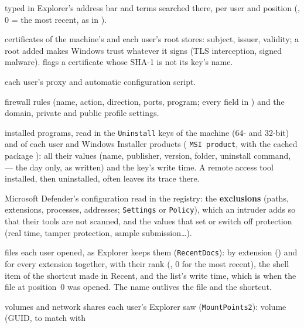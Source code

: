 \documentclass[11pt,a4paper,oneside]{report}
\begin{document}
\begin{description}[style=nextline,leftmargin=1.2em]
        typed in Explorer's address bar and terms searched there, per user and
        position (, 0 = the most recent, as in
        ).
  \item[\fichier{root\_certificates.json}] certificates of the machine's and each
        user's root stores: subject, issuer, validity; a root added makes Windows
        trust whatever it signs (TLS interception, signed malware).
         flags a certificate whose SHA-1 is not its
        key's name.
  \item[\fichier{internet\_settings.json}] each user's proxy and automatic
        configuration script.
  \item[\fichier{firewall.json}] firewall rules (name, action, direction, ports,
        program; every field in ) and the domain, private and
        public profile settings.
  \item[\fichier{installed\_programs.json}] installed programs, read in the
        \texttt{Uninstall} keys of the machine (64- and 32-bit) and of each user
        and Windows Installer products ( \texttt{MSI product},
        with the cached package ): all their values (name, publisher, version, folder,
        uninstall command,  --- the day only, as written) and
        the key's write time. A remote access tool installed, then uninstalled,
        often leaves its trace there.
  \item[\fichier{defender\_configuration.json}] Microsoft Defender's
        configuration read in the registry: the \textbf{exclusions} (paths,
        extensions, processes, addresses;  \texttt{Settings} or
        \texttt{Policy}), which an intruder adds so that their tools are not
        scanned, and the values that set or switch off protection (real time,
        tamper protection, sample submission\ldots).
  \item[\fichier{explorer\_recent\_docs.json}] files each user opened, as
        Explorer keeps them (\texttt{RecentDocs}): by extension
        () and for every extension together, with their rank
        (, 0 for the most recent), the shell item of the
        shortcut made in Recent, and the list's write time, which is when the
        file at position~0 was opened. The name outlives the file and the
        shortcut.
  \item[\fichier{mount\_points.json}] volumes and network shares each
        user's Explorer saw (\texttt{MountPoints2}): volume (GUID, to match with

\end{description}
\end{document}
